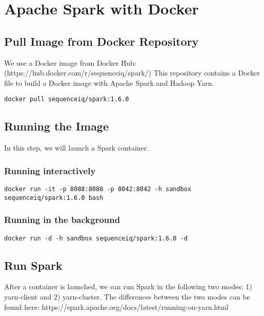 \section{Apache Spark with Docker}\label{apache-spark-with-docker}

\subsection{Pull Image from Docker
Repository}\label{pull-image-from-docker-repository}

We use a Docker image from Docker Hub:
(https://hub.docker.com/r/sequenceiq/spark/) This repository contains a
Docker file to build a Docker image with Apache Spark and Hadoop Yarn.

\begin{lstlisting}
docker pull sequenceiq/spark:1.6.0
\end{lstlisting}

\subsection{Running the Image}\label{running-the-image}

In this step, we will launch a Spark container.

\subsubsection{Running interactively}\label{running-interactively}

\begin{lstlisting}
docker run -it -p 8088:8088 -p 8042:8042 -h sandbox sequenceiq/spark:1.6.0 bash
\end{lstlisting}

\subsubsection{Running in the
background}\label{running-in-the-background}

\begin{lstlisting}
docker run -d -h sandbox sequenceiq/spark:1.6.0 -d
\end{lstlisting}

\subsection{Run Spark}\label{run-spark}

After a container is launched, we can run Spark in the following two
modes: 1) yarn-client and 2) yarn-cluster. The differences between the
two modes can be found here:
https://spark.apache.org/docs/latest/running-on-yarn.html

